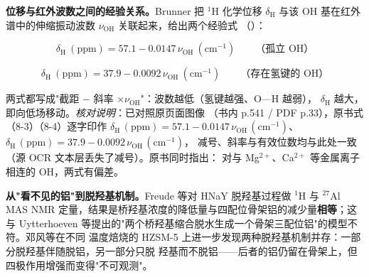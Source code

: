 \begin{principle}
\textbf{位移与红外波数之间的经验关系。}Brunner 把 $^{1}$H 化学位移 $\delta_{\mathrm{H}}$ 与该
OH 基在红外谱中的伸缩振动波数 $\nu_{\mathrm{OH}}$ 关联起来，给出两个经验式
（）：

\begin{equation}
\label{eq:brunner-iso}
\delta_{\mathrm{H}}\ (\mathrm{ppm})=57.1-0.0147\,\nu_{\mathrm{OH}}\ (\mathrm{cm^{-1}})
\qquad \text{（孤立 OH）}
\end{equation}

\begin{equation}
\label{eq:brunner-hb}
\delta_{\mathrm{H}}\ (\mathrm{ppm})=37.9-0.0092\,\nu_{\mathrm{OH}}\ (\mathrm{cm^{-1}})
\qquad \text{（存在氢键的 OH）}
\end{equation}

两式都写成"截距 $-$ 斜率 $\times\nu_{\mathrm{OH}}$"：波数越低（氢键越强、O—H 越弱），
$\delta_{\mathrm{H}}$ 越大，即向低场移动。\emph{核对说明}：已对照原页面图像
（书内 p.541 / PDF p.33），原书式（8-3）（8-4）逐字印作
$\delta_{\mathrm{H}}\,(\mathrm{ppm})=57.1-0.0147\,\nu_{\mathrm{OH}}\,(\mathrm{cm^{-1}})$、
$\delta_{\mathrm{H}}\,(\mathrm{ppm})=37.9-0.0092\,\nu_{\mathrm{OH}}\,(\mathrm{cm^{-1}})$，
减号、斜率与有效位数均与此处一致（源 OCR 文本层丢失了减号）。原书同时指出：
对与 Mg$^{2+}$、Ca$^{2+}$ 等金属离子相连的 OH，两式有偏差。
\end{principle}


\begin{dataflow}
\textbf{从"看不见的铝"到脱羟基机制。}Freude 等对 HNaY 脱羟基过程做 $^{1}$H 与 $^{27}$Al
MAS NMR 定量，结果是桥羟基浓度的降低量与四配位骨架铝的减少量\textbf{相等}；这与
Uytterhoeven 等提出的"两个桥羟基缩合脱水生成一个骨架三配位铝"的模型不符。邓风等在不同
温度焙烧的 HZSM-5 上进一步发现两种脱羟基机制并存：一部分脱羟基伴随脱铝，另一部分只脱
羟基而不脱铝——后者的铝仍留在骨架上，但四极作用增强而变得"不可观测"。
\end{dataflow}

